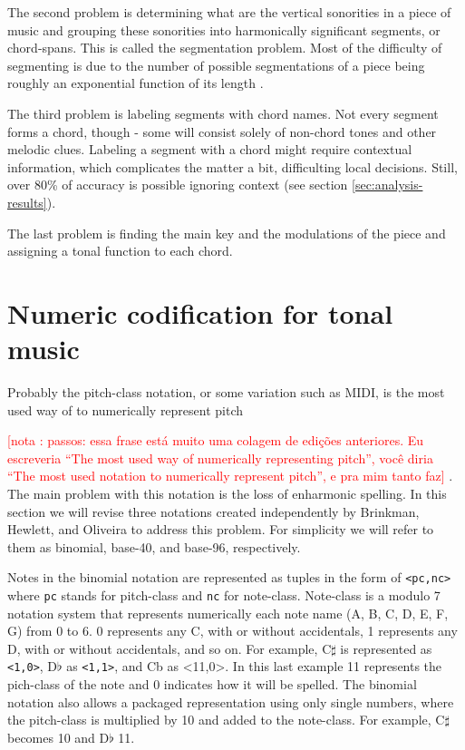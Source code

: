 \documentclass{article}
\newcounter{notacounter}
\newcommand{\nota}[1]{
  \addtocounter{notacounter}{1}
  \textcolor{red}{[nota \arabic{notacounter}: #1]}
}
\begin{document}
The second problem is determining what are the vertical sonorities in
a piece of music and grouping these sonorities into harmonically
significant segments, or chord-spans. This is called the segmentation
problem. Most of the difficulty of segmenting is due to the number of
possible segmentations of a piece being roughly an exponential
function of its length \cite{pardo02:algorithms}.

The third problem is labeling segments with chord names. Not every
segment forms a chord, though - some will consist solely of non-chord
tones and other melodic clues. Labeling a segment with a chord might
require contextual information, which complicates the matter a bit,
difficulting local decisions. Still, over 80\% of accuracy is possible
ignoring context (see section \ref{sec:analysis-results}).

The last problem is finding the main key and the modulations of the
piece and assigning a tonal function to each chord.

\section{Numeric codification for tonal music}
\label{sec:codificacao-jamary}

Probably the pitch-class notation, or some variation such as MIDI, is
the most used way of to numerically represent pitch \nota{ passos:
  essa frase está muito uma colagem de edições anteriores. Eu
  escreveria ``The most used way of numerically representing pitch'',
  você diria ``The most used notation to numerically represent
  pitch'', e pra mim tanto faz}. The main problem
with this notation is the loss of enharmonic spelling. In this section
we will revise three notations created independently by Brinkman,
Hewlett, and Oliveira \cite{brinkman86:_binom_repres_of_pitch_for,
  hewlett92:base40, oliveira01:codificacao} to address this problem.
For simplicity we will refer to them as binomial, base-40, and
base-96, respectively.

Notes in the binomial notation are represented as tuples in the form
of \texttt{<pc,nc>} where \texttt{pc} stands for pitch-class and
\texttt{nc} for note-class. Note-class is a modulo 7 notation system
that represents numerically each note name (A, B, C, D, E, F, G) from
0 to 6. 0 represents any C, with or without accidentals, 1 represents
any D, with or without accidentals, and so on. For example, C$\sharp$
is represented as \texttt{<1,0>}, D$\flat$ as \texttt{<1,1>}, and Cb
as <11,0>. In this last example 11 represents the pich-class of the
note and 0 indicates how it will be spelled. The binomial notation
also allows a packaged representation using only single numbers, where
the pitch-class is multiplied by 10 and added to the note-class. For
example, C$\sharp$ becomes 10 and D$\flat$ 11.
\end{document}
